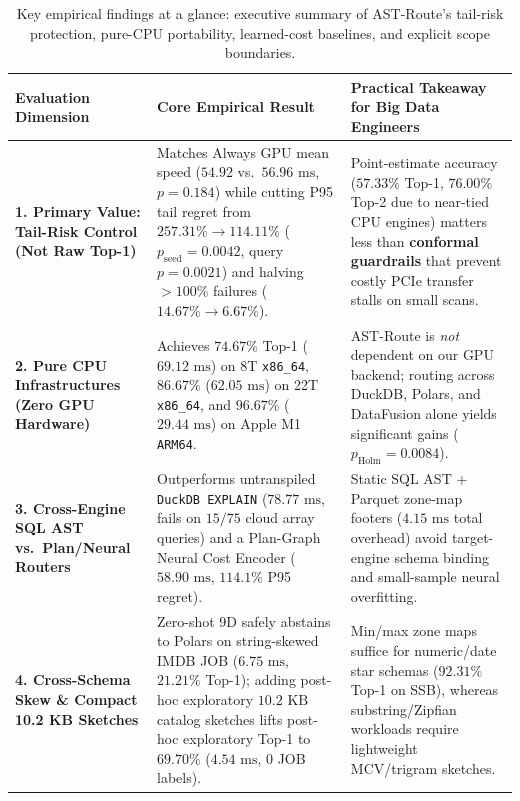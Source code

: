 \documentclass[10pt,a4paper]{article}
\newenvironment{fitasttable}{%
  \begin{lrbox}{\asttblbox}%
}{%
  \end{lrbox}%
  \sbox{\asttblboxB}{%
    \ifdim\wd\asttblbox>0.96\textwidth
      \resizebox{0.96\textwidth}{!}{\usebox{\asttblbox}}%
    \else
      \usebox{\asttblbox}%
    \fi
  }%
  \ifdim\ht\asttblboxB>0.72\textheight
    \resizebox{!}{0.72\textheight}{\usebox{\asttblboxB}}%
  \else
    \usebox{\asttblboxB}%
  \fi
}
\begin{document}
\begin{table}[!htbp]
{\centering
\caption{Key empirical findings at a glance: executive summary of AST-Route's tail-risk protection, pure-CPU portability, learned-cost baselines, and explicit scope boundaries.}\label{tab:key_findings_glance}\label{tab:jbd_glance_1a}
\setlength{\tabcolsep}{4.0pt}
\scriptsize
\begin{fitasttable}
\begin{tabular}{@{}p{2.9cm}p{5.3cm}p{6.8cm}@{}}
\toprule
\textbf{Evaluation Dimension} & \textbf{Core Empirical Result} & \textbf{Practical Takeaway for Big Data Engineers} \\
\midrule
\textbf{1. Primary Value: Tail-Risk Control (Not Raw Top-1)} & Matches Always GPU mean speed ($54.92$ vs.\ $56.96\text{ ms}$, $p=0.184$) while cutting P95 tail regret from $\mathbf{257.31\% \rightarrow 114.11\%}$ ($p_{\text{seed}}=0.0042$, query $p=0.0021$) and halving $>100\%$ failures ($14.67\%\rightarrow 6.67\%$). & Point-estimate accuracy ($57.33\%$ Top-1, $76.00\%$ Top-2 due to near-tied CPU engines) matters less than \textbf{conformal guardrails} that prevent costly PCIe transfer stalls on small scans. \\
\textbf{2. Pure CPU Infrastructures (Zero GPU Hardware)} & Achieves $74.67\%$ Top-1 ($69.12\text{ ms}$) on 8T \texttt{x86\_64}, $86.67\%$ ($62.05\text{ ms}$) on 22T \texttt{x86\_64}, and $96.67\%$ ($29.44\text{ ms}$) on Apple M1 \texttt{ARM64}. & AST-Route is \emph{not} dependent on our GPU backend; routing across DuckDB, Polars, and DataFusion alone yields significant gains ($p_{\text{Holm}}=0.0084$). \\
\textbf{3. Cross-Engine SQL AST vs.\ Plan/Neural Routers} & Outperforms untranspiled \texttt{DuckDB EXPLAIN} ($78.77\text{ ms}$, fails on $15/75$ cloud array queries) and a Plan-Graph Neural Cost Encoder ($58.90\text{ ms}$, $114.1\%$ P95 regret). & Static SQL AST + Parquet zone-map footers ($4.15\text{ ms}$ total overhead) avoid target-engine schema binding and small-sample neural overfitting. \\
\textbf{4. Cross-Schema Skew \& Compact 10.2 KB Sketches} & Zero-shot 9D safely abstains to Polars on string-skewed IMDB JOB ($6.75\text{ ms}$, $21.21\%$ Top-1); adding post-hoc exploratory $10.2\text{ KB}$ catalog sketches lifts post-hoc exploratory Top-1 to $\mathbf{69.70\%}$ ($4.54\text{ ms}$, $0$ JOB labels). & Min/max zone maps suffice for numeric/date star schemas ($92.31\%$ Top-1 on SSB), whereas substring/Zipfian workloads require lightweight MCV/trigram sketches. \\

\end{tabular}
\end{fitasttable}}
\end{table}
\end{document}
